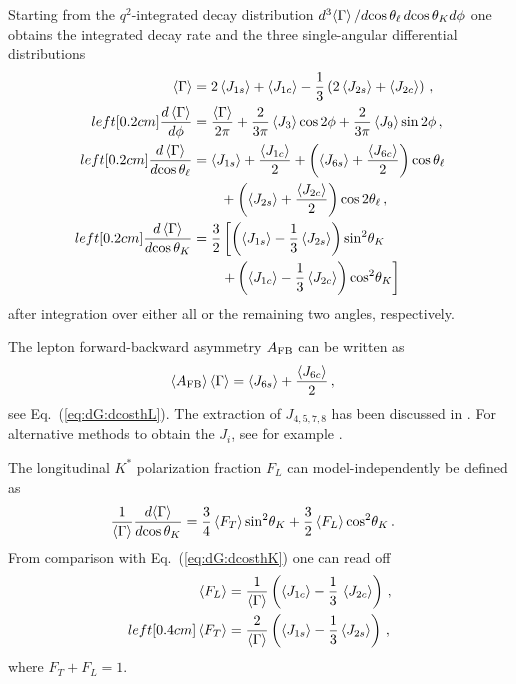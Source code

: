 Starting from the $q^2$-integrated decay distribution $d^3\!\braket{\Gamma} /
d\!\cos{\theta_\ell}\, d\!\cos{\theta_{K}} d\phi$ one obtains the integrated decay rate and the
three single-angular differential distributions
\begin{align}
  \label{eq:Gint}
  \braket{\Gamma} & =
    2 \braket{J_{1s}} + \braket{J_{1c}} 
  - \frac{1}{3} \left(2 \braket{J_{2s}} + \braket{J_{2c}} \right)\,, 
\\left\lbrack0.2cm]
  \label{eq:dG:dphi}
  \frac{d\braket{\Gamma}}{d\phi} & =  
      \frac{\braket{\Gamma}}{2\pi} 
    + \frac{2}{3\pi} \braket{J_3} \cos 2\phi 
    + \frac{2}{3\pi} \braket{J_9} \sin 2\phi\,,
\\left\lbrack0.2cm]
  \frac{d\braket{\Gamma}}{d\!\cos{\theta_\ell}} & =
      \braket{J_{1s}} + \frac{\braket{J_{1c}}}{2}
    + \left(\braket{J_{6s}} + \frac{\braket{J_{6c}}}{2} \right) \cos{\theta_\ell} 
\nonumber \\
    & \qquad+ \left(\braket{J_{2s}} + \frac{\braket{J_{2c}}}{2} \right) \cos 2{\theta_\ell} \,,
  \label{eq:dG:dcosthL}
\\left\lbrack0.2cm]
  \frac{d\braket{\Gamma}}{d\!\cos{\theta_{K}}} & = 
  \frac{3}{2} \left\lbrack
       \left(\braket{J_{1s}} - \frac{1}{3} \braket{J_{2s}} \right) \sin^2\!{\theta_{K}}  \right.
\nonumber \\
   & \qquad \left. + \left(\braket{J_{1c}} - \frac{1}{3} \braket{J_{2c}} \right) \cos^2\!{\theta_{K}}
    \right\rbrack
    \label{eq:dG:dcosthK}
\end{align}
after integration over either all or the remaining two angles, respectively. 

%
The lepton forward-backward asymmetry $A_{\rm FB}$ can be written as 
\begin{align} \label{eq:afb}
  \braket{A_{\rm FB}} \braket{\Gamma} & 
   = \braket{J_{6s}} + \frac{\braket{J_{6c}}}{2} \, ,
\end{align}
see Eq.~(\ref{eq:dG:dcosthL}). 
%
The extraction of $J_{4,5,7,8}$ has been discussed in \cite{Bobeth:2008ij}.  For
alternative methods to obtain the $J_i$, see for example \cite{Kim:2007fx,
  Altmannshofer:2008dz,Matias:2012qz}.

The longitudinal
$K^*$ polarization fraction $F_L$ can model-independently be defined  as
\begin{align}
  \label{eq:dGdcK}
  \frac{1}{\braket{\Gamma}} \frac{d\!\braket{\Gamma}}{d\!\cos{\theta_{K}}} & =
     \frac{3}{4} \braket{F_T} \sin^2\!{\theta_{K}}
   + \frac{3}{2} \braket{F_L} \cos^2\!{\theta_{K}} \,.
   \end{align}
{}From comparison with Eq.~(\ref{eq:dG:dcosthK}) one can read off
\begin{align}
  \label{eq:defFL}
  \braket{F_L} & = \frac{1}{\braket{\Gamma}} \left(
     \braket{J_{1c}}  - \frac{1}{3}\, \braket{J_{2c}} \right)\,, \\left\lbrack0.4cm]
  \label{eq:defFT}
  \braket{F_T} & = \frac{2}{\braket{\Gamma}} \left(
     \braket{J_{1s}} - \frac{1}{3} \braket{J_{2s}} \right)\,,
\end{align}
where $F_T + F_L = 1$.


